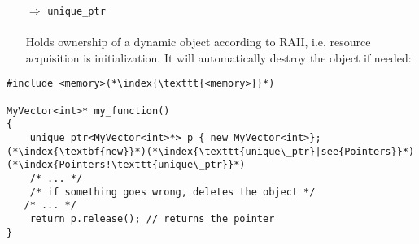 \documentclass[10pt]{article}
\begin{document}
\begin{enumerate}
\item[$\Rightarrow$] \texttt{unique\_ptr}\\ \\
Holds ownership of a dynamic object according to RAII, i.e. resource acquisition is initialization. It will 
automatically destroy the object if needed:
\end{enumerate}
\begin{lstlisting}
#include <memory>(*\index{\texttt{<memory>}}*)

MyVector<int>* my_function()
{
    unique_ptr<MyVector<int>*> p { new MyVector<int>};(*\index{\textbf{new}}*)(*\index{\texttt{unique\_ptr}|see{Pointers}}*)(*\index{Pointers!\texttt{unique\_ptr}}*)
    /* ... */
    /* if something goes wrong, deletes the object */
   /* ... */   
    return p.release(); // returns the pointer
}
\end{lstlisting}
%
%
\end{document}
